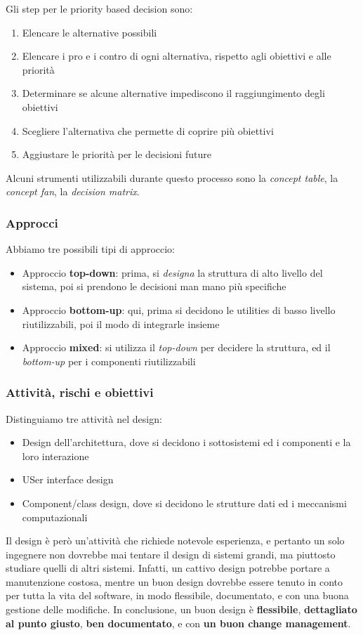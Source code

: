 \documentclass[11pt]{article}
\begin{document}
Gli step per le priority based decision sono:
\begin{enumerate}
    \item Elencare le alternative possibili
    \item Elencare i pro e i contro di ogni alternativa, rispetto agli obiettivi e alle priorità 
    \item Determinare se alcune alternative impediscono il raggiungimento degli obiettivi 
    \item Scegliere l'alternativa che permette di coprire più obiettivi 
    \item Aggiustare le priorità per le decisioni future
\end{enumerate}
Alcuni strumenti utilizzabili durante questo processo sono la \textit{concept table}, la \textit{concept fan}, la \textit{decision matrix}.
\subsubsection{Approcci}
Abbiamo tre possibili tipi di approccio:
\begin{itemize}
    \item Approccio \textbf{top-down}: prima, si \textit{designa} la struttura di alto livello del sistema, poi si prendono le decisioni man mano più specifiche 
    \item Approccio \textbf{bottom-up}: qui, prima si decidono le utilities di basso livello riutilizzabili, poi il modo di integrarle insieme 
    \item Approccio \textbf{mixed}: si utilizza il \textit{top-down} per decidere la struttura, ed il \textit{bottom-up} per i componenti riutilizzabili 
\end{itemize}
\subsubsection{Attività, rischi e obiettivi}
Distinguiamo tre attività nel design:
\begin{itemize}
    \item Design dell'architettura, dove si decidono i sottosistemi ed i componenti e la loro interazione 
    \item USer interface design 
    \item Component/class design, dove si decidono le strutture dati ed i meccanismi computazionali
\end{itemize}
Il design è però un'attività che richiede notevole esperienza, e pertanto un solo ingegnere non dovrebbe mai tentare il design di sistemi grandi, ma piuttosto studiare quelli di altri sistemi. Infatti, un cattivo design potrebbe portare a manutenzione costosa, mentre un buon design dovrebbe essere tenuto in conto per tutta la vita del software, in modo flessibile, documentato, e con una buona gestione delle modifiche. 
In conclusione, un buon design è \textbf{flessibile}, \textbf{dettagliato al punto giusto}, \textbf{ben documentato}, e con \textbf{un buon change management}.
\end{document}
